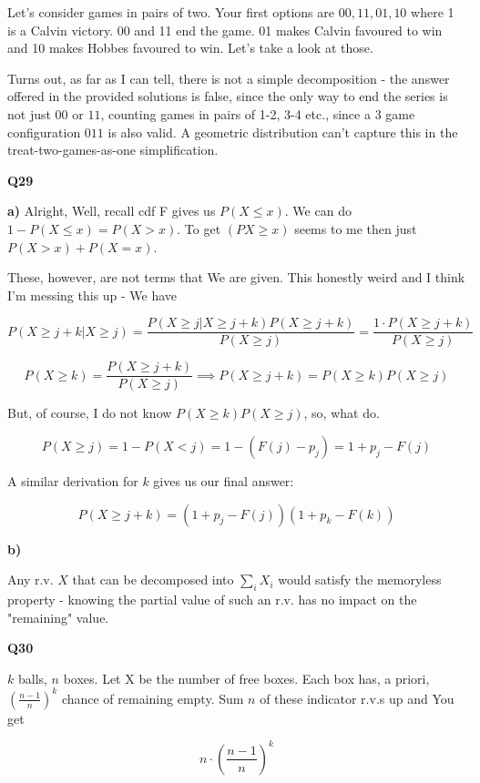 \documentclass{article}
\begin{document}
		Let's consider games in pairs of two. Your first options are $00, 11, 01, 10$ where 1 is a Calvin victory.
		00 and 11 end the game. 01 makes Calvin favoured to win and 10 makes Hobbes favoured to win. Let's take a look at those.
		
		Turns out, as far as I can tell, there is not a simple decomposition - the answer offered in the provided solutions is false, since the only way to end the series is not just $00$ or $11$, counting games in pairs of 1-2, 3-4 etc., since a 3 game configuration $011$ is also valid. A geometric distribution can't capture this in the treat-two-games-as-one simplification.
		
		\hfill
		
		\textbf{Q29}
		
		\textbf{a)} Alright, Well, recall cdf F gives us $P(X \le x)$. We can do $1-P(X \le x) = P(X > x)$. To get $(PX \ge x)$ seems to me then just $P(X > x) + P(X = x)$.
		
		These, however, are not terms that We are given. This honestly weird and I think I'm messing this up - We have 
		
		\[P(X \ge j+k\vert X \ge j) = \frac{P(X\ge j\vert X\ge j+k)P(X \ge j+k)	}{P(X\ge j)} = \frac{1\cdot P(X \ge j+k)}{P(X\ge j)} \]
		
		\[P(X \ge k) = \frac{P(X \ge j+k)}{P(X\ge j)}\implies P(X\ge j+k) = P(X\ge k)P(X\ge j) \]
		
		But, of course, I do not know $P(X\ge k)P(X\ge j)$, so, what do. 
		
		\[P(X\ge j) = 1-P(X < j) = 1-(F(j)-p_j) = 1+p_j-F(j)\]
		
		A similar derivation for $k$ gives us our final answer:
		
		\[ P(X\ge j+k) = (1+p_j-F(j))(1+p_k-F(k)) \]
		
		\textbf{b)}
		
		Any r.v. $X$ that can be decomposed into $\sum_i X_i$ would satisfy the memoryless property - knowing the partial value of such an r.v. has no impact on the "remaining" value.
		
		\hfill
		
		\textbf{Q30}
		
		$k$ balls, $n$ boxes. Let X be the number of free boxes. Each box has, a priori, $\left( \frac{n-1}{n} \right)^k$ chance of remaining empty. Sum $n$ of these indicator r.v.s up and You get
		
		\[ n\cdot \left( \frac{n-1}{n} \right)^k \]
		
		\hfill
		
\end{document}

